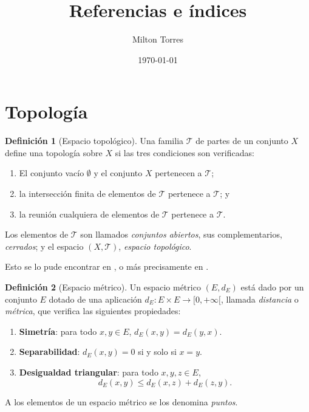\documentclass[11pt]{article}
\title{Referencias e índices}
\author{Milton Torres}
\date{\today}
\theoremstyle{plain}%
\theoremstyle{definition}%
\newtheorem{defn}{Definición}[section]
\begin{document}
\maketitle
\tableofcontents


\lipsum
\section{Topología}

\begin{defn}[Espacio topológico]
	Una familia \(\mathcal{T}\) de partes de un conjunto \(X\) define una topología sobre \(X\) si las tres condiciones son verificadas:
	\begin{enumerate}
		\item El conjunto vacío \(\emptyset\) y el conjunto \(X\) pertenecen a \(\mathcal{T}\);
		\item la intersección finita de elementos de \(\mathcal{T}\) pertenece a \(\mathcal{T}\); y
		\item la reunión cualquiera de elementos de \(\mathcal{T}\) pertenece a \(\mathcal{T}\).
	\end{enumerate}
	Los elementos de \(\mathcal{T}\) son llamados \emph{conjuntos abiertos}, sus complementarios, \emph{cerrados}; y el espacio \((X, \mathcal{T})\), \emph{espacio topológico}.
	 
\end{defn}
Esto se lo pude encontrar en \cite{VK1997}, o más precisamente en \cite[p.\,3]{VK1997}.\\




\begin{defn}[Espacio métrico]
	Un espacio métrico \((E, d_{E})\) está dado por un conjunto \(E\) dotado de una aplicación  \(d_E : E \times E \longrightarrow [0,+\infty[\), llamada \emph{distancia} o \emph{métrica}, que verifica las siguientes propiedades:
	\begin{enumerate}
		\item[D.1] \textbf{Simetría}: para todo \(x, y\in E\), \(d_{E}(x,y) = d_{E} (y,x)\).
		\item[D.2] \textbf{Separabilidad}: \(d_{E}(x,y)=0\) si y solo si \(x=y\).
		\item[D.3] \textbf{Desigualdad triangular}: para todo \(x, y, z\in E\),
		\[
			d_{E}(x,y)\leq d_{E}(x,z)+d_{E}(z,y).
      		\]
	\end{enumerate}
	A los elementos de un espacio métrico se los denomina \emph{puntos}.
\end{defn}
\end{document}
